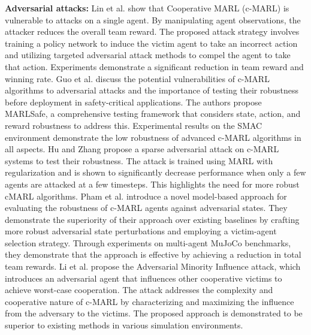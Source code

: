 \documentclass[acmsmall]{acmart}
\begin{document}
\textbf{Adversarial attacks:} Lin et al. \cite{9283830} show that Cooperative MARL (c-MARL) is vulnerable to attacks on a single agent. By manipulating agent observations, the attacker reduces the overall team reward. %
The proposed attack strategy involves training a policy network to induce the victim agent to take an incorrect action and utilizing targeted adversarial attack methods to compel the agent to take that action.
Experiments demonstrate a significant reduction in team reward and winning rate.
Guo et al. \cite{Guo_2022_CVPR} discuss the potential vulnerabilities of c-MARL algorithms to adversarial attacks and the importance of testing their robustness before deployment in safety-critical applications. The authors propose MARLSafe, a comprehensive testing framework that considers state, action, and reward robustness to address this. Experimental results on the SMAC environment demonstrate the low robustness of advanced c-MARL algorithms in all aspects.
Hu and Zhang \cite{hu2022sparse} propose a sparse adversarial attack on c-MARL systems to test their robustness. The attack is trained using MARL with regularization and is shown to significantly decrease performance when only a few agents are attacked at a few timesteps. This highlights the need for more robust cMARL algorithms.
Pham et al. \cite{pham2022evaluating} introduce a novel model-based approach for evaluating the robustness of c-MARL agents against adversarial states. They demonstrate the superiority of their approach over existing baselines by crafting more robust adversarial state perturbations and employing a victim-agent selection strategy. 
Through experiments on multi-agent MuJoCo benchmarks, they demonstrate that 
the approach is effective by achieving a reduction in total team rewards.
Li et al. \cite{li2023attacking} propose the Adversarial Minority Influence attack, which introduces an adversarial agent that influences other cooperative victims to achieve worst-case cooperation. The attack addresses the complexity and cooperative nature of c-MARL by characterizing and maximizing the influence from the adversary to the victims. The proposed approach is demonstrated to be superior to existing methods in various simulation environments.
\end{document}
